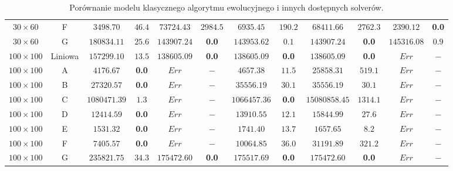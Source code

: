 \begin{table}[H]
\begin{center}
{\begin{tabular}{c|c||c|c||c|c||c|c||c|c||c|c}
            $30 \times 60$ & F           & $3498.70$ & $46.4$                    & $73724.43$ & $2984.5$      & $6935.45$ & $190.2$       & $68411.66$ & $2762.3$     & $2390.12$ & \textbf{0.0} \\
            $30 \times 60$ & G           & $180834.11$ & $25.6$                  & $143907.24$ & \textbf{0.0}        & $143953.62$ & $0.1$       & $143907.24$ & \textbf{0.0}        & $145316.08$ & $0.9$ \\
            \hline
            $100 \times 100$ & Liniowa   & $157299.10$ & $13.5$                  & $138605.09$ & \textbf{0.0}        & $138605.09$ & \textbf{0.0}       & $138605.09$ & \textbf{0.0}       & $Err$ & $-$ \\
            $100 \times 100$ & A         & $4176.67$ & \textbf{0.0}                     & $Err$ & $-$                & $4657.38$ & $11.5$        & $25858.31$ & $519.1$      & $Err$ & $-$ \\
            $100 \times 100$ & B         & $27320.57$ & \textbf{0.0}                    & $Err$ & $-$                & $35556.19$ & $30.1$       & $35556.19$ & $30.1$       & $Err$ & $-$ \\
            $100 \times 100$ & C         & $1080471.39$ & $1.3$                  & $Err$ & $-$                & $1066457.36$ & \textbf{0.0}      & $15080858.45$ & $1314.1$  & $Err$ & $-$ \\
            $100 \times 100$ & D         & $12414.59$ & \textbf{0.0}                    & $Err$ & $-$                & $13910.55$ & $12.1$       & $15844.99$ & $27.6$       & $Err$ & $-$ \\
            $100 \times 100$ & E         & $1531.32$ & \textbf{0.0}                     & $Err$ & $-$                & $1741.40$ & $13.7$        & $1657.65$ & $8.2$         & $Err$ & $-$ \\
            $100 \times 100$ & F         & $7405.57$ & \textbf{0.0}                     & $Err$ & $-$                & $10064.85$ & $36.0$       & $31191.89$ & $321.2$      & $Err$ & $-$ \\
            $100 \times 100$ & G         & $235821.75$ & $34.3$                  & $175472.60$ & \textbf{0.0}        & $175517.69$ & \textbf{0.0}       & $175472.60$ & \textbf{0.0}       & $Err$ & $-$ \\
        \end{tabular}
        }
    \end{center}
    \caption{Porównanie modelu klasycznego algorytmu ewolucyjnego i innych dostępnych solverów.}
    \label{wyniki-2}
\end{table}

